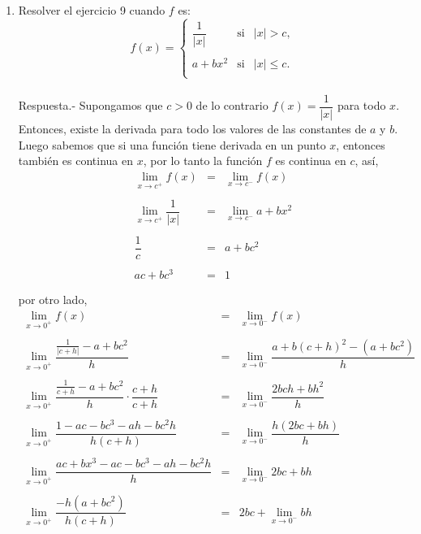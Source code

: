 \begin{enumerate}[\bfseries 1.]
    \item Resolver el ejercicio 9 cuando $f$ es:
    $$f(x)=\left\{\begin{array}{lcl}
	    \dfrac{1}{|x|}&\mbox{si}&|x|>c,\\\\
	    a+bx^2 &\mbox{si}&|x|\leq c.\\
    \end{array}\right.$$\\
	Respuesta.-\; Supongamos que $c>0$ de lo contrario $f(x)=\dfrac{1}{|x|}$ para todo $x$. Entonces, existe la derivada para todo los valores de las constantes de $a$ y $b$. Luego sabemos que si una función tiene derivada en un punto $x$, entonces también es continua en $x$, por lo tanto la función $f$ es continua en $c$, así,\\
	$$\begin{array}{rcl}
	    \lim\limits_{x\to c^+}f(x)&=&\lim\limits_{x\to c^-}f(x)\\\\
	    \lim\limits_{x\to c^+}\dfrac{1}{|x|}&=&\lim\limits_{x\to c^-}a+bx^2\\\\
	    \dfrac{1}{c}&=&a+bc^2\\\\
			ac+bc^3&=&1\\\\
	\end{array}$$
	por otro lado,
	$$\begin{array}{rcl}
	    \lim\limits_{x\to 0^+}f(x)&=&\lim\limits_{x\to 0^-}f(x)\\\\
	    \lim\limits_{x\to 0^+}\dfrac{\frac{1}{|c+h|}-a+bc^2}{h}&=&\lim\limits_{x\to 0^-}\dfrac{a+b(c+h)^2-(a+bc^2)}{h}\\\\
	    \lim\limits_{x\to 0^+}\dfrac{\frac{1}{c+h}-a+bc^2}{h}\cdot \dfrac{c+h}{c+h}&=&\lim\limits_{x\to 0^-}\dfrac{2bch+bh^2}{h}\\\\
	    \lim\limits_{x\to 0^+}\dfrac{1-ac-bc^3-ah-bc^2h}{h(c+h)}&=&\lim\limits_{x\to 0^-}\dfrac{h(2bc+bh)}{h}\\\\
	    \lim\limits_{x\to 0^+}\dfrac{ac+bx^3-ac-bc^3-ah-bc^2h}{h}&=&\lim\limits_{x\to 0^-}2bc+bh\\\\
	    \lim\limits_{x\to 0^+}\dfrac{-h(a+bc^2)}{h(c+h)}&=&2bc+\lim\limits_{x\to 0^-}bh\\\\

\end{array}$$
\end{enumerate}
